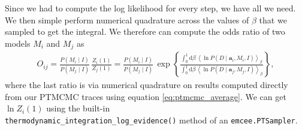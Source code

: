 Since we had to compute the log likelihood for every step, we have all
we need.  We then simple perform numerical quadrature across the
values of $\beta$ that we sampled to get the integral.  We therefore
can compute the odds ratio of two models $M_i$ and $M_j$ as
\begin{align}
O_{ij} = \frac{P(M_i\mid I)}{P(M_j\mid I)}\,\frac{Z_i(1)}{Z_j(1)}
= \frac{P(M_i\mid I)}{P(M_j\mid I)}\,\exp\left\{\frac{\int_0^1\mathrm{d}\beta\,\left\langle \ln P(D\mid \mathbf{a}_i, M_i, I)\right\rangle_\beta}{\int_0^1\mathrm{d}\beta\,\left\langle \ln P(D\mid \mathbf{a}_j, M_j, I)\right\rangle_\beta}\right\},
\end{align}
where the last ratio is via numerical quadrature on results computed
directly from our PTMCMC traces using equation
\eqref{eq:ptmcmc_average}.  We can get $\ln Z_i(1)$ using the built-in\\
\verb|thermodynamic_integration_log_evidence()| method of an
\texttt{emcee.PTSampler}.
